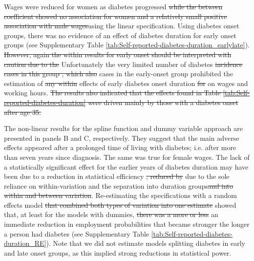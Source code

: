 \documentclass[12pt,english]{article}
\providecommand{\DIFaddtex}[1]{{\protect\color{blue}#1}} %
\providecommand{\DIFdeltex}[1]{{\protect\color{red}\sout{#1}}}                      %
\providecommand{\DIFaddbegin}{} %
\providecommand{\DIFaddend}{} %
\providecommand{\DIFdelbegin}{} %
\providecommand{\DIFdelend}{} %
\providecommand{\DIFadd}[1]{\texorpdfstring{\DIFaddtex{#1}}{#1}} %
\providecommand{\DIFdel}[1]{\texorpdfstring{\DIFdeltex{#1}}{}} %
\begin{document}
\DIFadd{Wages were reduced for women }\DIFaddend as diabetes progressed \DIFdelbegin \DIFdel{while the between coefficient showed no association for women and a relatively small positive association with male wages}\DIFdelend \DIFaddbegin \DIFadd{using the linear specification}\DIFaddend . Using diabetes onset groups, there was no evidence of an effect of diabetes duration for early onset groups (see Supplementary Table \ref{tab:Self-reported-diabetes-duration_earlylate}). \DIFdelbegin \DIFdel{However, again the within results for early onset should be interpreted with caution due to the }\DIFdelend \DIFaddbegin \DIFadd{Unfortunately the very }\DIFaddend limited number of diabetes \DIFdelbegin \DIFdel{incidence cases in this group , which also }\DIFdelend \DIFaddbegin \DIFadd{cases in the early-onset group }\DIFaddend prohibited the estimation of \DIFdelbegin \DIFdel{any within }\DIFdelend effects of early diabetes onset duration \DIFdelbegin \DIFdel{for }\DIFdelend \DIFaddbegin \DIFadd{on }\DIFaddend wages and working hours.
\DIFdelbegin \DIFdel{The results also indicated that the effects found in Table \ref{tab:Self-reported-diabetes-duration} were driven mainly by those with a diabetes onset after age 35.
}\DIFdelend 


The non-linear results for the spline function and dummy variable approach are  presented in panels B and C, respectively. They suggest that the main adverse effects appeared after a prolonged time of living with diabetes; i.e. after more than seven years since diagnosis. The same was true for female wages. The lack of a statistically significant effect for the earlier years of diabetes duration may have been due to a reduction in statistical efficiency \DIFdelbegin \DIFdel{, reduced by }\DIFdelend \DIFaddbegin \DIFadd{due to the sole reliance on within-variation and }\DIFaddend the separation into duration groups\DIFdelbegin \DIFdel{and into within and between variation}\DIFdelend . Re-estimating the specifications with a random effects model \DIFdelbegin \DIFdel{that combined both types of variation into one estimate }\DIFdelend showed that, at least for the models with dummies, \DIFdelbegin \DIFdel{there was a more or less }\DIFdelend \DIFaddbegin \DIFadd{an }\DIFaddend immediate reduction in employment probabilities that became stronger the longer a person had diabetes (see Supplementary Table \ref{tab:Self-reported-diabetes-duration_RE}). Note that we did not estimate models splitting diabetes in early and late onset groups, as this implied strong reductions in statistical power.
\end{document}
